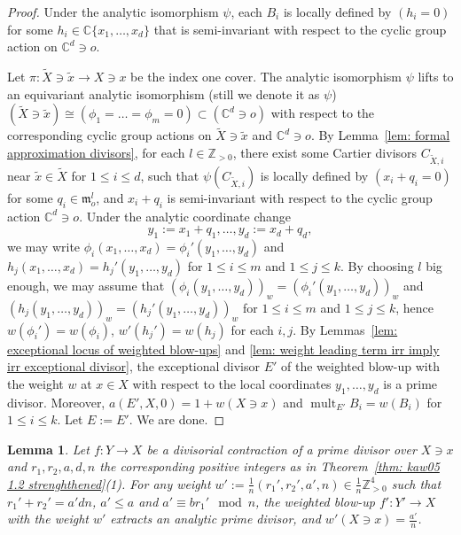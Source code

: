 \documentclass[11pt]{amsart}
\numberwithin{equation}{section}
\newcommand{\Cc}{\mathbb{C}}
\newcommand{\Zz}{\mathbb{Z}}
\newcommand{\mult}{\operatorname{mult}}
\newtheorem{lem}[thm]{Lemma}
\theoremstyle{definition}
\theoremstyle{definition}
\begin{document}
\begin{proof}
Under the analytic isomorphism $\psi$, each $B_i$ is locally defined by $(h_i=0)$ for some $h_i\in \Cc\{x_1,\dots,x_d\}$ that is semi-invariant with respect to the cyclic group action on $\Cc^d\ni o$.

Let $\pi:\tilde{X}\ni \tilde{x}\to X\ni x$ be the index one cover. The analytic isomorphism $\psi$ lifts to an equivariant analytic isomorphism (still we denote it as $\psi$) $(\tilde{X}\ni \tilde{x})\cong (\phi_1=\dots =\phi_m=0)\subset(\Cc^d\ni o)$ with respect to the corresponding cyclic group actions on $\tilde{X}\ni \tilde{x}$ and $\Cc^d\ni o$. By Lemma~\ref{lem: formal approximation divisors}, for each $l\in \Zz_{>0}$, there exist some Cartier divisors $C_{\tilde X,i}$ near $\tilde{x}\in \tilde{X}$ for $1\leq i\leq d$, such that $\psi(C_{\tilde{X},i})$ is locally defined by $(x_i+q_i=0)$ for some $q_i\in \mathfrak{m}_o^l$, and $x_i+q_i$ is semi-invariant with respect to the cyclic group action $\Cc^d\ni o$. Under the analytic coordinate change $$y_1:=x_1+q_1,\dots,y_d:=x_d+q_d,$$ we may write $\phi_i(x_1,\dots,x_d)=\phi_i'(y_1,\dots,y_d)$ and $h_j(x_1,\dots,x_d)=h_j'(y_1,\dots,y_d)$ for $1\leq i\leq m$ and $1\leq j\leq k$. By choosing $l$ big enough, we may assume that $(\phi_i(y_1,\dots,y_d))_{w}=(\phi_i'(y_1,\dots,y_d))_{w}$ and $(h_j(y_1,\dots,y_d))_{w}=(h_j'(y_1,\dots,y_d))_{w}$ for $1\leq i\leq m$ and $1\leq j\leq k$, hence $w(\phi_i')=w(\phi_i)$, $w'(h_j')=w(h_j)$ for each $i,j$. By Lemmas~\ref{lem: exceptional locus of weighted blow-ups} and \ref{lem: weight leading term irr imply irr exceptional divisor}, the exceptional divisor $E'$ of the weighted blow-up with the weight $w$ at $x\in X$ with respect to the local coordinates $y_1,\dots,y_d$ is a prime divisor. Moreover, $a(E',X,0)=1+w(X\ni x)$ and $\mult_{E'}B_i=w(B_i)$ for $1\leq i\leq k$. Let $E:=E'$. We are done.
\end{proof}




\begin{lem}\label{lem: irreducibility of exceptional divisors extracted by weighted blow up}
Let $f: Y\to X$ be a divisorial contraction of a prime divisor over $X\ni x$ and $r_1,r_2,a,d,n$ the corresponding positive integers as in Theorem~\ref{thm: kaw05 1.2 strenghthened}(1). For any weight $w':=\frac{1}{n}(r_1',r_2',a',n)\in\frac{1}{n}\mathbb Z_{>0}^4$ such that $r_1'+r_2'=a'dn$, $a'\leq a$ and $a'\equiv br_1'\mod n$, the weighted blow-up $f':Y'\to X$ with the weight $w'$ extracts an analytic prime divisor, and $w'(X\ni x)=\frac{a'}{n}$. 
\end{lem}
\end{document}
